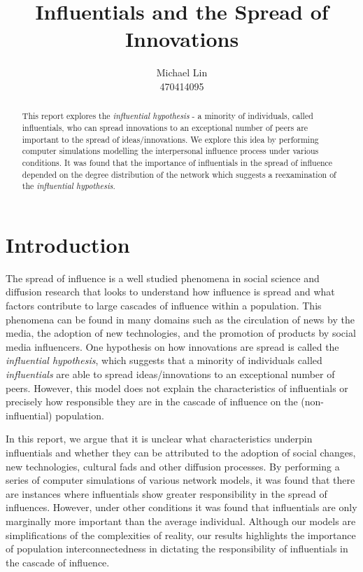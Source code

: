 \documentclass[10pt, oneside, reqno]{amsart}
\title{Influentials and the Spread of Innovations}                                %
\author{Michael Lin\\470414095}
\theoremstyle{plain}%
\theoremstyle{definition}
\theoremstyle{remark}
\begin{document}
\vspace*{-1.5cm}
\begin{abstract}
    This report explores the \textit{influential hypothesis} - a minority of individuals, called 
    influentials, who can spread innovations to an exceptional number of peers are important to 
    the spread of ideas/innovations. We explore this idea by performing computer simulations 
    modelling the interpersonal influence process under various conditions. It was found that 
    the importance of influentials in the spread of influence depended on the degree distribution
    of the network which suggests a reexamination of the \textit{influential hypothesis}.
\end{abstract}
\maketitle 

\section{Introduction}

The spread of influence is a well studied phenomena in social science and diffusion research 
that looks to understand how influence is spread and what factors contribute to large cascades
of influence within a population. 
This phenomena can be found in many domains such as the circulation of news by the media, the 
adoption of new technologies, and the promotion of products by social media influencers.
One hypothesis on how innovations are spread is called the \textit{influential hypothesis}\cite{Influential},
which suggests that a minority of individuals called \textit{influentials} are able to spread 
ideas/innovations to an exceptional number of peers. 
However, this model does not explain the characteristics of influentials or precisely how 
responsible they are in the cascade of influence on the (non-influential) population.

In this report, we argue that it is unclear what characteristics underpin influentials and 
whether they can be attributed to the adoption of social changes, new technologies, cultural 
fads and other diffusion processes.
By performing a series of computer simulations of various network models, it was found that 
there are instances where influentials show greater responsibility in the spread of influences.
However, under other conditions it was found that influentials are only marginally more important
than the average individual. 
Although our models are simplifications of the complexities of reality, our results highlights
the importance of population interconnectedness in dictating the responsibility of influentials
in the cascade of influence.
\end{document}
